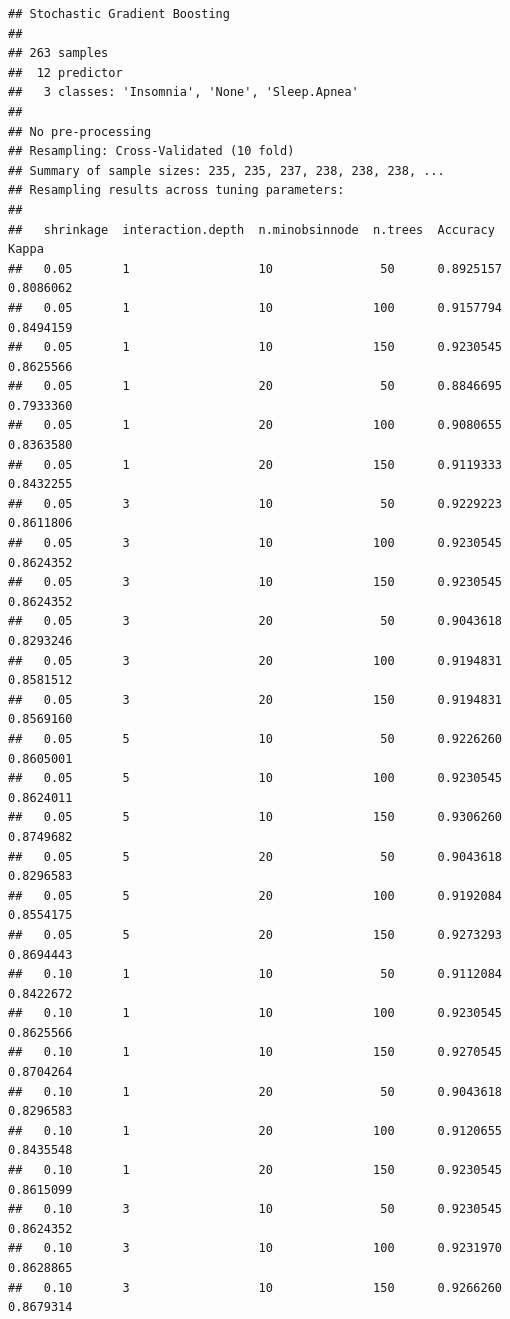 \documentclass[
]{article}
\begin{document}
\begin{verbatim}
## Stochastic Gradient Boosting 
## 
## 263 samples
##  12 predictor
##   3 classes: 'Insomnia', 'None', 'Sleep.Apnea' 
## 
## No pre-processing
## Resampling: Cross-Validated (10 fold) 
## Summary of sample sizes: 235, 235, 237, 238, 238, 238, ... 
## Resampling results across tuning parameters:
## 
##   shrinkage  interaction.depth  n.minobsinnode  n.trees  Accuracy   Kappa    
##   0.05       1                  10               50      0.8925157  0.8086062
##   0.05       1                  10              100      0.9157794  0.8494159
##   0.05       1                  10              150      0.9230545  0.8625566
##   0.05       1                  20               50      0.8846695  0.7933360
##   0.05       1                  20              100      0.9080655  0.8363580
##   0.05       1                  20              150      0.9119333  0.8432255
##   0.05       3                  10               50      0.9229223  0.8611806
##   0.05       3                  10              100      0.9230545  0.8624352
##   0.05       3                  10              150      0.9230545  0.8624352
##   0.05       3                  20               50      0.9043618  0.8293246
##   0.05       3                  20              100      0.9194831  0.8581512
##   0.05       3                  20              150      0.9194831  0.8569160
##   0.05       5                  10               50      0.9226260  0.8605001
##   0.05       5                  10              100      0.9230545  0.8624011
##   0.05       5                  10              150      0.9306260  0.8749682
##   0.05       5                  20               50      0.9043618  0.8296583
##   0.05       5                  20              100      0.9192084  0.8554175
##   0.05       5                  20              150      0.9273293  0.8694443
##   0.10       1                  10               50      0.9112084  0.8422672
##   0.10       1                  10              100      0.9230545  0.8625566
##   0.10       1                  10              150      0.9270545  0.8704264
##   0.10       1                  20               50      0.9043618  0.8296583
##   0.10       1                  20              100      0.9120655  0.8435548
##   0.10       1                  20              150      0.9230545  0.8615099
##   0.10       3                  10               50      0.9230545  0.8624352
##   0.10       3                  10              100      0.9231970  0.8628865
##   0.10       3                  10              150      0.9266260  0.8679314

\end{verbatim}
\end{document}
